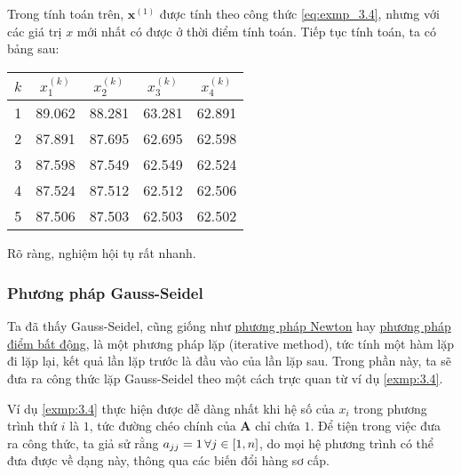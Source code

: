\documentclass[../../Lectures]{subfiles}
\begin{document}
\begin{exmp}
    Trong tính toán trên, \(\bm{x}^{(1)}\) được tính theo công thức
    \eqref{eq:exmp_3.4}, nhưng với các giá trị \(x\) mới nhất có được ở thời
    điểm tính toán. Tiếp tục tính toán, ta có bảng sau:
    \begin{table}[H]
        \centering
        \begin{tabular}{ r *{4}{ S[table-format=2.3] } }
            \toprule
            \(k\)  &  {\(x_1^{(k)}\)}  &  {\(x_2^{(k)}\)}  &  {\(x_3^{(k)}\)}  &  {\(x_4^{(k)}\)}  \\
              &         89.062    &         88.281    &         63.281    &         62.891    \\
                2  &         87.891    &         87.695    &         62.695    &         62.598    \\
                3  &         87.598    &         87.549    &         62.549    &         62.524    \\
                4  &         87.524    &         87.512    &         62.512    &         62.506    \\
                5  &         87.506    &         87.503    &         62.503    &         62.502    \\
            \bottomrule
        \end{tabular}
    \end{table}

    Rõ ràng, nghiệm hội tụ rất nhanh.
\end{exmp}

\subsubsection{Phương pháp Gauss-Seidel}

Ta đã thấy Gauss-Seidel, cũng giống như \hyperref[chapter2:method:newton]{phương
pháp Newton} hay \hyperref[chapter2:method:fixed_point]{phương pháp điểm bất
động}, là một phương pháp lặp (iterative method), tức tính một hàm lặp đi lặp
lại, kết quả lần lặp trước là đầu vào của lần lặp sau. Trong phần này, ta sẽ đưa
ra công thức lặp Gauss-Seidel theo một cách trực quan từ ví dụ \ref{exmp:3.4}.

Ví dụ \ref{exmp:3.4} thực hiện được dễ dàng nhất khi hệ số của \(x_i\) trong
phương trình thứ \(i\) là \(1\), tức đường chéo chính của \(\bm{A}\) chỉ chứa
\(1\). Để tiện trong việc đưa ra công thức, ta giả sử rằng \(a_{jj} = 1 \,
\forall j \in \interval{1}{n}\), do mọi hệ phương trình có thể đưa được về dạng
này, thông qua các biến đổi hàng sơ cấp.
\end{document}
